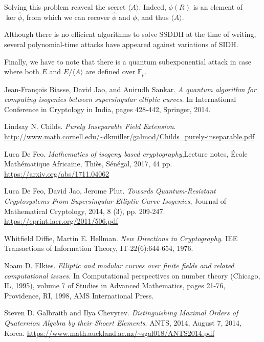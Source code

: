 \documentclass{article}
\theoremstyle{theorem}
\theoremstyle{definition}
\begin{document}
Solving this problem reaveal the secret $\langle A \rangle$. Indeed, $\phi(R)$ is an element of $\ker\hat{\phi}$, from which we can recover $\hat{\phi}$ and $\phi$, and thus $\langle A \rangle$. 

Although there is no efficient algorithms to solve SSDDH at the time of writing, several polynomial-time attacks have appeared  against variations of SIDH.

Finally, we have to note that there is a quantum subexponential attack \cite{IsogeniesSSEC} in case where both $E$ and $E/\langle A \rangle$ are defined over $\mathbb{F}_p$.

\newpage
\begin{thebibliography}{}
	 Jean-François Biasse, David Jao, and Anirudh Sankar. \textit{A quantum algorithm for computing isogenies between supersingular elliptic curves}. In International Conference in Cryptology in India, pages 428-442, Springer, 2014.
	
	 Lindsay N. Childs. \textit{Purely Inseparable Field Extension}. \url{http://www.math.cornell.edu/~dkmiller/galmod/Childs_purely-inseparable.pdf}
	
	 Luca De Feo. \textit{Mathematics of isogeny based cryptography},Lecture notes, École Mathématique Africaine, Thiès, Sénégal, 2017, 44 pp. \url{https://arxiv.org/abs/1711.04062}
	
	 Luca De Feo, David Jao, Jerome Plut. \textit{Towards Quantum-Resistant Cryptosystems From Supersingular Elliptic Curve Isogenies}, Journal of Mathematical Cryptology, 2014, 8 (3), pp. 209-247. \url{https://eprint.iacr.org/2011/506.pdf}
	
	 Whitfield Diffie, Martin E. Hellman. \textit{New Directions in Cryptography}. IEE Transactions of Information Theory, IT-22(6):644-654, 1976.
	
	 Noam D. Elkies. \textit{Elliptic and modular curves over finite fields and related computational issues.} In Computational perspectives on number theory (Chicago, IL, 1995), volume 7 of Studies in Advanced Mathematics, pages 21-76, Providence, RI, 1998, AMS International Press.
	
	 Steven D. Galbraith and Ilya Chevyrev. \textit{Distinguishing Maximal Orders of Quaternion Algebra by their Shoert Elements}. ANTS, 2014, August 7, 2014, Korea. \url{https://www.math.auckland.ac.nz/~sgal018/ANTS2014.pdf}
	

\end{thebibliography}
\end{document}
